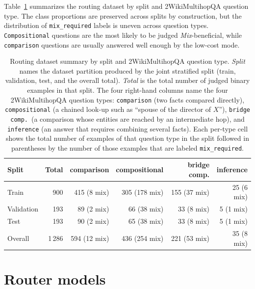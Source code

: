 \documentclass[english, bibtex]{kththesis}               %
\numberwithin{listing}{chapter}
\begin{document}
Table~\ref{tab:datasetSummary} summarizes the routing dataset by split and 2WikiMultihopQA question type. The class proportions are preserved across splits by construction, but the distribution of \texttt{mix\_required} labels is uneven across question types. \texttt{Compositional} questions are the most likely to be judged \emph{Mix}-beneficial, while \texttt{comparison} questions are usually answered well enough by the low-cost mode.

\begin{table}[!ht]
\begin{center}
\caption{Routing dataset summary by split and 2WikiMultihopQA question type. \emph{Split} names the dataset partition produced by the joint stratified split (train, validation, test, and the overall total). \emph{Total} is the total number of judged binary examples in that split. The four right-hand columns name the four 2WikiMultihopQA question types: \texttt{comparison} (two facts compared directly), \texttt{compositional} (a chained look-up such as ``spouse of the director of $X$''), \texttt{bridge comp.}\ (a comparison whose entities are reached by an intermediate hop), and \texttt{inference} (an answer that requires combining several facts). Each per-type cell shows the total number of examples of that question type in the split followed in parentheses by the number of those examples that are labeled \texttt{mix\_required}.}
\label{tab:datasetSummary}
\footnotesize
\setlength{\tabcolsep}{3pt}
\begin{tabular}{l|r|rrrr}
\textbf{Split} & \textbf{Total} & \textbf{comparison} & \textbf{compositional} & \textbf{bridge comp.} & \textbf{inference} \\
\hline
Train & 900 & 415 (8 mix) & 305 (178 mix) & 155 (37 mix) & 25 (6 mix) \\
Validation & 193 & 89 (2 mix) & 66 (38 mix) & 33 (8 mix) & 5 (1 mix) \\
Test & 193 & 90 (2 mix) & 65 (38 mix) & 33 (8 mix) & 5 (1 mix) \\
\hline
Overall & 1\,286 & 594 (12 mix) & 436 (254 mix) & 221 (53 mix) & 35 (8 mix) \\
\end{tabular}
\end{center}
\end{table}

\section{Router models}
\label{sec:methodRouters}
\end{document}

